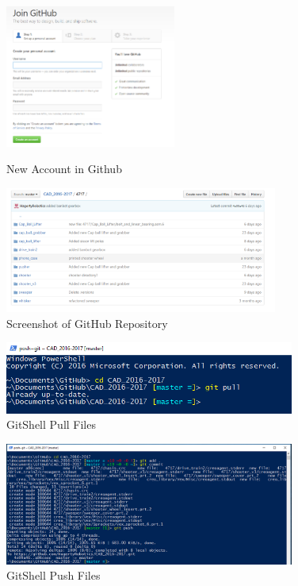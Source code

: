 \begin{figure}[ht]
\centering
\begin{minipage}[b]{.50\textwidth}
  \centering
  \includegraphics[width=0.5\textwidth]{Meetings/September/09-23-21/githubnewacc.png}
  \caption{New Account in Github}
  \label{fig:pic1}
\end{minipage}%
\hfill%
\begin{minipage}[b]{.50\textwidth}
  \centering
  \includegraphics[width=0.8\textwidth]{Meetings/September/09-23-21/githubrepository.png}
  \caption{Screenshot of GitHub Repository}
  \label{fig:pic2}
\end{minipage}
\end{figure}




\begin{figure}
\centering
\includegraphics[width=0.85\textwidth, angle=0]{Meetings/September/09-23-21/gitshellpull.png}
\caption{GitShell Pull Files}
\label{fig:pic3}
\end{figure}


\begin{figure}
\centering
\includegraphics[width=0.85\textwidth, angle=0]{Meetings/September/09-23-21/gitshellpush.png}
\caption{GitShell Push Files}
\label{fig:pic4}
\end{figure}







